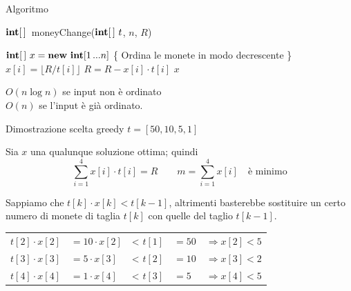 \begin{frame}{Algoritmo}
	
\vspace{-12pt}
\begin{Procedure}
\caption[A]{$\INTARRAY$\ \textsf{moneyChange}($\INTARRAY\ t$, \INTEGER $n$, \INTEGER $R$)}
$\INTARRAY\ x = \NEW\ \INTEGER[1 \mydots n]$\;
\{ Ordina le monete in modo decrescente \}\;
 {
  $x[i] = \lfloor R/t[i] \rfloor$\;
  $R = R - x[i] \cdot t[i]$\;
}
\Return $x$\;
\end{Procedure}
	
 $O(n \log n)$ se input non è ordinato\\
\makebox[2.5cm][l]{} $O(n)$ se l'input è già ordinato.

\end{frame}

\begin{frame}{Dimostrazione scelta greedy $t = [50,10,5,1]$}

\vspace{-9pt}
\BIL
\item Sia $x$ una qualunque soluzione ottima; quindi
\[
	\sum_{i=1}^4 x[i] \cdot t[i] = R \qquad m = \sum_{i=1}^4 x[i] \quad \textrm{è minimo}
\]

\item Sappiamo che $t[k] \cdot x[k] < t[k-1]$, altrimenti basterebbe sostituire un certo numero di monete di taglia $t[k]$ con quelle del taglio $t[k-1]$.

\bigskip
\begin{tabular}{lllll}
    $t[2] \cdot x[2]$ & $= 10 \cdot x[2]$ &< $t[1]$ & $= 50$ & $\Rightarrow x[2] < 5$\\
    $t[3] \cdot x[3]$ & $= 5 \cdot x[3]$ &< $t[2]$ & $= 10$ & $\Rightarrow x[3] < 2$\\
    $t[4] \cdot x[4]$ & $= 1 \cdot x[4]$ &< $t[3]$ & $= 5$ & $\Rightarrow x[4] < 5$\\
\end{tabular}
\EIL

\end{frame}

